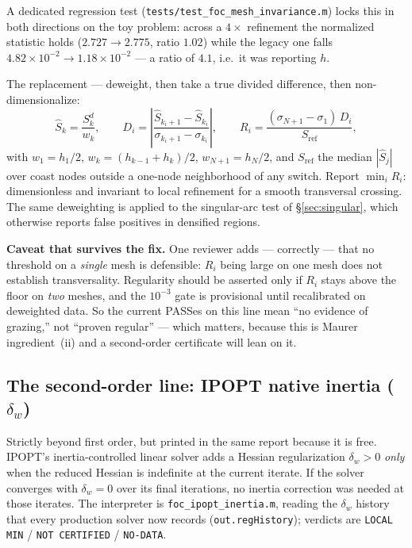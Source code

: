 \documentclass[11pt]{article}
\newcommand{\file}[1]{\texttt{#1}}
\newcommand{\code}[1]{\texttt{#1}}
\begin{document}
A dedicated regression test (\file{tests/test\_foc\_mesh\_invariance.m}) locks
this in both directions on the toy problem: across a $4\times$ refinement the
normalized statistic holds ($2.727\to2.775$, ratio $1.02$) while the legacy one
falls $4.82\times10^{-2}\to1.18\times10^{-2}$ --- a ratio of $4.1$, i.e.\ it was
reporting $h$.

The replacement --- deweight, then take a true divided difference, then
non-dimensionalize:
\begin{equation}
\widehat S_k=\frac{S^d_k}{w_k},\qquad
D_i=\left|\frac{\widehat S_{k_i+1}-\widehat S_{k_i}}
{\sigma_{k_i+1}-\sigma_{k_i}}\right|,\qquad
R_i=\frac{(\sigma_{N+1}-\sigma_1)\,D_i}{S_{\mathrm{ref}}},
\label{eq:sdotfix}
\end{equation}
with $w_1=h_1/2$, $w_k=(h_{k-1}+h_k)/2$, $w_{N+1}=h_N/2$, and
$S_{\mathrm{ref}}$ the median $|\widehat S_j|$ over coast nodes outside a
one-node neighborhood of any switch. Report $\min_i R_i$: dimensionless and
invariant to local refinement for a smooth transversal crossing. The same
deweighting is applied to the singular-arc test of \S\ref{sec:singular}, which
otherwise reports false positives in densified regions.

\textbf{Caveat that survives the fix.} One reviewer adds --- correctly --- that
no threshold on a \emph{single} mesh is defensible: $R_i$ being large on one
mesh does not establish transversality. Regularity should be asserted only if
$R_i$ stays above the floor on \emph{two} meshes, and the $10^{-3}$ gate is
provisional until recalibrated on deweighted data. So the current PASSes on
this line mean ``no evidence of grazing,'' not ``proven regular'' --- which
matters, because this is Maurer ingredient~(ii) and a second-order certificate
will lean on it.

\subsection{The second-order line: IPOPT native inertia ($\delta_w$)}
\label{sec:inertia}

Strictly beyond first order, but printed in the same report because it is
free. IPOPT's inertia-controlled linear solver adds a Hessian regularization
$\delta_w>0$ \emph{only} when the reduced Hessian is indefinite at the current
iterate. If the solver converges with $\delta_w=0$ over its final iterations,
no inertia correction was needed at those iterates. The interpreter is
\file{foc\_ipopt\_inertia.m}, reading the $\delta_w$ history that every
production solver now records (\code{out.regHistory}); verdicts are
\code{LOCAL MIN} / \code{NOT CERTIFIED} / \code{NO-DATA}.
\end{document}
